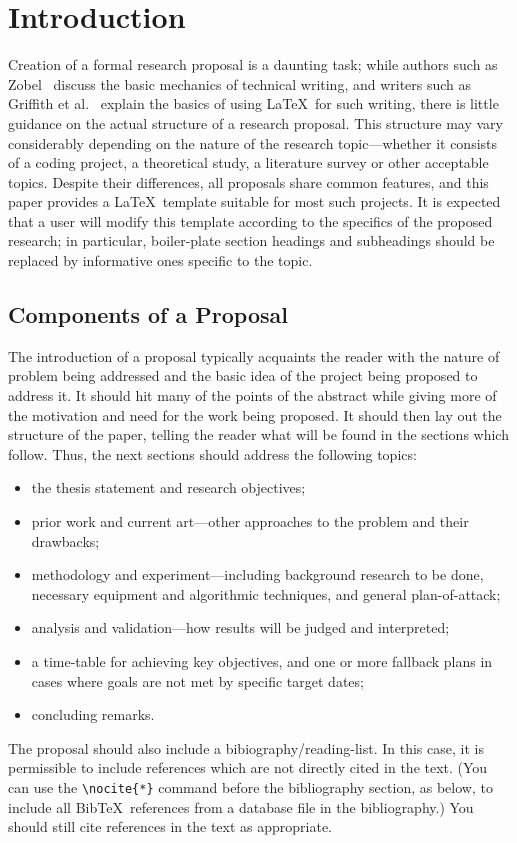 
\section{Introduction}\label{ch:overview}

Creation of a formal research proposal is a daunting task; while authors
such as Zobel~\cite{zobel:97} discuss the basic mechanics of technical
writing, and writers such as Griffith et al.~\cite{griffiths:97}
explain the basics of using \LaTeX\ for such writing, there is little
guidance on the actual structure of a research proposal.
This structure may vary considerably depending on the nature of the
research topic---whether it consists of a coding project, a theoretical
study, a literature survey or other acceptable topics.  Despite their
differences, all proposals share common features, and this paper provides
a \LaTeX\ template suitable for most such projects.  It is expected that
a user will modify this template according to the specifics of the
proposed research; in particular, boiler-plate section headings
and subheadings should be replaced by informative ones specific to
the topic.

\subsection{Components of a Proposal}
The introduction of a proposal typically acquaints the reader with
the nature of problem being addressed and the basic idea of the
project being proposed to address it.  It should hit many of the points
of the abstract while giving more of the motivation and need for the
work being proposed.  It should then lay out the structure of the
paper, telling the reader what will be found in the sections which
follow.  Thus, the next sections should address the following topics:
\begin{itemize}
\item
the thesis statement and research objectives;
\item
prior work and current art---other approaches to the problem and
their drawbacks;
\item
methodology and experiment---including background research
to be done, necessary equipment and algorithmic techniques, and general
plan-of-attack;
\item
analysis and validation---how results will be judged and interpreted;
\item
a time-table for achieving key objectives, and one or more fallback plans
in cases where goals are not met by specific target dates;
\item concluding remarks.
\end{itemize}
The proposal should also include a bibiography/reading-list.  In
this case, it is permissible to include references which are not directly
cited in the text.  (You can use the \verb+\nocite{*}+ command before the
bibliography section, as below, to include all Bib\TeX\ references
from a database file in the bibliography.)  You should still cite
references in the text as appropriate.

